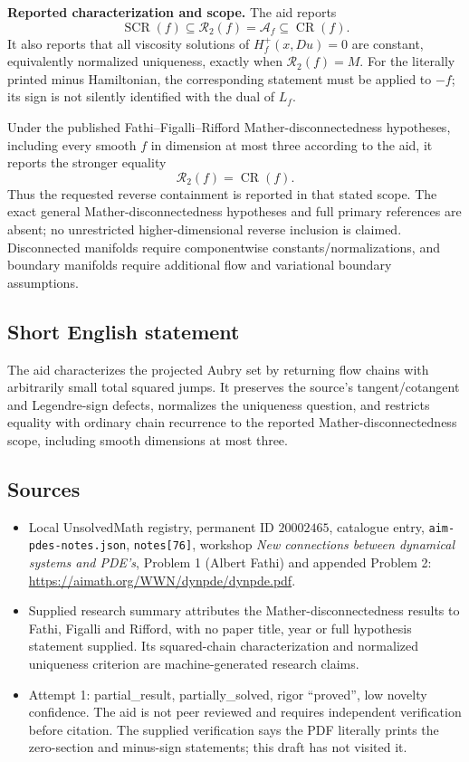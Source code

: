 \documentclass[11pt]{article}
\begin{document}
\textbf{Reported characterization and scope.} The aid reports
\[
 \operatorname{SCR}(f)\subseteq\mathcal R_2(f)
 =\mathcal A_f\subseteq\operatorname{CR}(f).
\]
It also reports that all viscosity solutions of \(H_f^+(x,Du)=0\) are constant, equivalently normalized uniqueness, exactly when \(\mathcal R_2(f)=M\). For the literally printed minus Hamiltonian, the corresponding statement must be applied to \(-f\); its sign is not silently identified with the dual of \(L_f\).

Under the published Fathi--Figalli--Rifford Mather-disconnectedness hypotheses, including every smooth \(f\) in dimension at most three according to the aid, it reports the stronger equality
\[
 \mathcal R_2(f)=\operatorname{CR}(f).
\]
Thus the requested reverse containment is reported in that stated scope. The exact general Mather-disconnectedness hypotheses and full primary references are absent; no unrestricted higher-dimensional reverse inclusion is claimed. Disconnected manifolds require componentwise constants/normalizations, and boundary manifolds require additional flow and variational boundary assumptions.
\subsection{Short English statement}
The aid characterizes the projected Aubry set by returning flow chains with arbitrarily small total squared jumps. It preserves the source's tangent/cotangent and Legendre-sign defects, normalizes the uniqueness question, and restricts equality with ordinary chain recurrence to the reported Mather-disconnectedness scope, including smooth dimensions at most three.
\subsection{Sources}
\begin{itemize}
\item Local UnsolvedMath registry, permanent ID \(20002465\), catalogue entry, \texttt{aim-pdes-notes.json}, \texttt{notes[76]}, workshop \emph{New connections between dynamical systems and PDE's}, Problem 1 (Albert Fathi) and appended Problem 2: \url{https://aimath.org/WWN/dynpde/dynpde.pdf}.
\item Supplied research summary attributes the Mather-disconnectedness results to Fathi, Figalli and Rifford, with no paper title, year or full hypothesis statement supplied. Its squared-chain characterization and normalized uniqueness criterion are machine-generated research claims.
\item Attempt 1: partial\_result, partially\_solved, rigor ``proved'', low novelty confidence. The aid is not peer reviewed and requires independent verification before citation. The supplied verification says the PDF literally prints the zero-section and minus-sign statements; this draft has not visited it.
\end{itemize}
\end{document}
